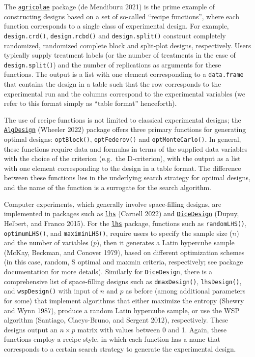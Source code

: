 \documentclass{article}
\begin{document}
The
\href{https://cran.r-project.org/web/packages/agricolae/index.html}{\texttt{agricolae}}
package (de Mendiburu 2021) is the prime example of constructing designs
based on a set of so-called ``recipe functions'', where each function
corresponds to a single class of experimental design. For example,
\texttt{design.crd()}, \texttt{design.rcbd()} and
\texttt{design.split()} construct completely randomized, randomized
complete block and split-plot designs, respectively. Users typically
supply treatment labels (or the number of treatments in the case of
\texttt{design.split()}) and the number of replications as arguments for
these functions. The output is a list with one element corresponding to
a \texttt{data.frame} that contains the design in a table such that the
row corresponds to the experimental run and the columns correspond to
the experimental variables (we refer to this format simply as ``table
format'' henceforth).

The use of recipe functions is not limited to classical experimental
designs; the
\href{https://cran.r-project.org/web/packages/AlgDesign/index.html}{\texttt{AlgDesign}}
(Wheeler 2022) package offers three primary functions for generating
optimal designs: \texttt{optBlock()}, \texttt{optFederov()} and
\texttt{optMonteCarlo()}. In general, these functions require data and
formulas in terms of the supplied data variables with the choice of the
criterion (e.g.~the D-criterion), with the output as a list with one
element corresponding to the design in a table format. The difference
between these functions lies in the underlying search strategy for
optimal designs, and the name of the function is a surrogate for the
search algorithm.

Computer experiments, which generally involve space-filling designs, are
implemented in packages such as
\href{https://cran.r-project.org/web/packages/lhs/index.html}{\texttt{lhs}}
(Carnell 2022) and
\href{https://cran.r-project.org/web/packages/DiceDesign/index.html}{\texttt{DiceDesign}}
(Dupuy, Helbert, and Franco 2015). For the
\href{https://cran.r-project.org/web/packages/lhs/index.html}{\texttt{lhs}}
package, functions such as \texttt{randomLHS()}, \texttt{optimumLHS()},
and \texttt{maximinLHS()}, require users to specify the sample size
(\(n\)) and the number of variables (\(p\)), then it generates a Latin
hypercube sample (McKay, Beckman, and Conover 1979), based on different
optimization schemes (in this case, random, S optimal and maxmin
criteria, respectively; see package documentation for more details).
Similarly for
\href{https://cran.r-project.org/web/packages/DiceDesign/index.html}{\texttt{DiceDesign}},
there is a comprehensive list of space-filling designs such as
\texttt{dmaxDesign()}, \texttt{lhsDesign()}, and \texttt{wspDesign()}
with input of \(n\) and \(p\) as before (among additional parameters for
some) that implement algorithms that either maximize the entropy (Shewry
and Wynn 1987), produce a random Latin hypercube sample, or use the WSP
algorithm (Santiago, Claeys-Bruno, and Sergent 2012), respectively.
These designs output an \(n \times p\) matrix with values between 0 and
1. Again, these functions employ a recipe style, in which each function
has a name that corresponds to a certain search strategy to generate the
experimental design.
\end{document}
